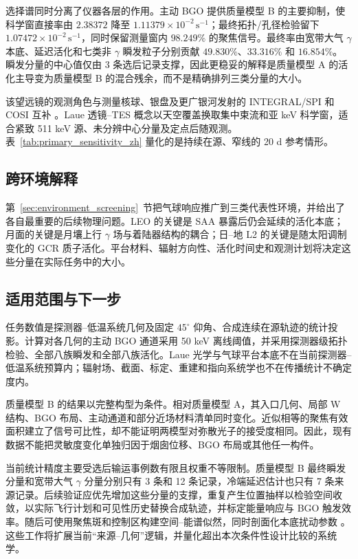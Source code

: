 \documentclass[11pt]{article}
\newcommand{\revblue}[1]{\textcolor{revisionblue}{#1}}
\newcommand{\cps}{\,\mathrm{s^{-1}}}
\begin{document}
选择谱同时分离了仪器各层的作用。主动 BGO 提供质量模型 B 的主要抑制，使科学窗直接率由 $2.38372$ 降至 $1.11379\times10^{-2}\cps$；最终拓扑/孔径检验留下 $1.07472\times10^{-2}\cps$，同时保留测量窗内 $98.249\%$ 的聚焦信号。最终率由宽带大气 $\gamma$ 本底、延迟活化和\revblue{七类非 $\gamma$ 瞬发粒子}分别贡献 $49.830\%$、$33.316\%$ 和 $16.854\%$。瞬发分量的中心值仅由 3 条选后记录支撑，因此更稳妥的解释是质量模型 A 的活化主导变为质量模型 B 的混合残余，而不是精确排列三类分量的大小。

该望远镜的观测角色与测量核球、银盘及更广银河发射的 INTEGRAL/SPI 和 COSI 互补 \cite{Siegert2016AA,Kierans2020,Siegert2020COSI,Yoneda2025,Karwin2023}。Laue 透镜--TES 概念以天空覆盖换取集中束流和亚 keV 科学窗，适合紧致 511 keV 源、未分辨中心分量及定点后随观测。表~\ref{tab:primary_sensitivity_zh} 量化的是持续在源、窄线的 20 d 参考情形。

\subsection{跨环境解释}

第~\ref{sec:environment_screening}~节把气球响应推广到三类代表性环境，并给出了各自最重要的后续物理问题。LEO 的关键是 SAA 暴露后仍会延续的活化本底；月面的关键是月壤上行 $\gamma$ 场与着陆器结构的耦合；日--地 L2 的关键是随太阳调制变化的 GCR 质子活化。平台材料、辐射方向性、活化时间史和观测计划将决定这些分量在实际任务中的大小。

\subsection{适用范围与下一步}
\label{subsec:limitations}

任务数值是探测器--低温系统几何及固定 $45^\circ$ 仰角、合成连续在源轨迹的统计投影。计算对各几何的主动 BGO 通道采用 50 keV 离线阈值，并采用探测器级拓扑检验、全部八族瞬发和全部八族活化。Laue 光学与气球平台本底不在当前探测器--低温系统预算内；辐射场、截面、标定、重建和指向系统学也不在传播统计不确定度内。

质量模型 B 的结果以完整构型为条件。相对质量模型 A，其入口几何、局部 W 结构、BGO 布局、主动通道和部分近场材料清单同时变化。近似相等的聚焦有效面积建立了信号可比性，却不能证明两模型对弥散光子的接受度相同。因此，现有数据不能把灵敏度变化单独归因于烟囱位移、BGO 布局或其他任一构件。

当前统计精度主要受选后输运事例数有限且权重不等限制。质量模型 B 最终瞬发分量和宽带大气 $\gamma$ 分量分别只有 3 条和 12 条记录，冷端延迟估计也只有 7 条来源记录。后续验证应优先增加这些分量的支撑，重复产生位置抽样以检验空间收敛，以实际飞行计划和可见性历史替换合成轨迹，并标定能量响应与 BGO 触发效率。随后可使用聚焦斑和控制区构建空间--能谱似然，同时剖面化本底扰动参数 \cite{Cowan2011}。这些工作将扩展当前“来源--几何”逻辑，并量化超出本次条件性设计比较的系统学。
\end{document}
